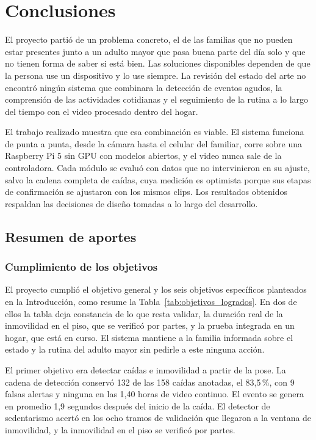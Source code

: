 \chapter{Conclusiones}\label{conclusions}

El proyecto partió de un problema concreto, el de las familias que no pueden estar presentes junto a un adulto mayor que pasa buena parte del día solo y que no tienen forma de saber si está bien.
Las soluciones disponibles dependen de que la persona use un dispositivo y lo use siempre.
La revisión del estado del arte no encontró ningún sistema que combinara la detección de eventos agudos, la comprensión de las actividades cotidianas y el seguimiento de la rutina a lo largo del tiempo con el video procesado dentro del hogar.

El trabajo realizado muestra que esa combinación es viable.
El sistema funciona de punta a punta, desde la cámara hasta el celular del familiar, corre sobre una Raspberry Pi 5 sin GPU con modelos abiertos, y el video nunca sale de la controladora.
Cada módulo se evaluó con datos que no intervinieron en su ajuste, salvo la cadena completa de caídas, cuya medición es optimista porque sus etapas de confirmación se ajustaron con los mismos clips.
Los resultados obtenidos respaldan las decisiones de diseño tomadas a lo largo del desarrollo.

\section{Resumen de aportes}

\subsection{Cumplimiento de los objetivos}

El proyecto cumplió el objetivo general y los seis objetivos específicos planteados en la Introducción, como resume la Tabla~\ref{tab:objetivos_logrados}.
En dos de ellos la tabla deja constancia de lo que resta validar, la duración real de la inmovilidad en el piso, que se verificó por partes, y la prueba integrada en un hogar, que está en curso.
El sistema mantiene a la familia informada sobre el estado y la rutina del adulto mayor sin pedirle a este ninguna acción.

El primer objetivo era detectar caídas e inmovilidad a partir de la pose.
La cadena de detección conservó 132 de las 158 caídas anotadas, el 83,5\,\%, con 9 falsas alertas y ninguna en las 1,40 horas de video continuo.
El evento se genera en promedio 1,9 segundos después del inicio de la caída.
El detector de sedentarismo acertó en los ocho tramos de validación que llegaron a la ventana de inmovilidad, y la inmovilidad en el piso se verificó por partes.

